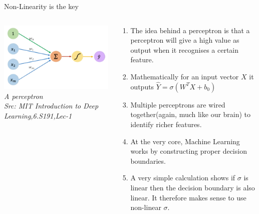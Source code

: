 \begin{frame}
\end{frame}

\usebackgroundtemplate{ }


\begin{frame}{Non-Linearity is the key}
  \begin{columns}[T]
  \begin{column}{0.4\textwidth}
	\includegraphics[width=\textwidth]{images/nobg perceptron.png}
	\tiny{\textit{A perceptron\\ Src: MIT Introduction to Deep Learning,6.S191,Lec-1}}
  \end{column}
  \begin{column}{0.6\textwidth}
  \begin{enumerate}[$\bullet$]
  \item The idea behind a perceptron is that a perceptron will give a high value as output when it recognises a certain feature.\pause
  \item Mathematically for an input vector $X$ it outputs $\hat{Y}=\sigma(W^TX+b_0)$ \pause
  \item Multiple perceptrons are wired together(again, much like our brain) to identify richer features.\pause
  \item At the very core, Machine Learning works by constructing proper decision boundaries.\pause
  \item A very simple calculation shows if $\sigma$ is linear then the decision boundary is also linear. It therefore makes sense to use non-linear $\sigma$.
  \end{enumerate}
  \end{column}
\end{columns}
\end{frame}


